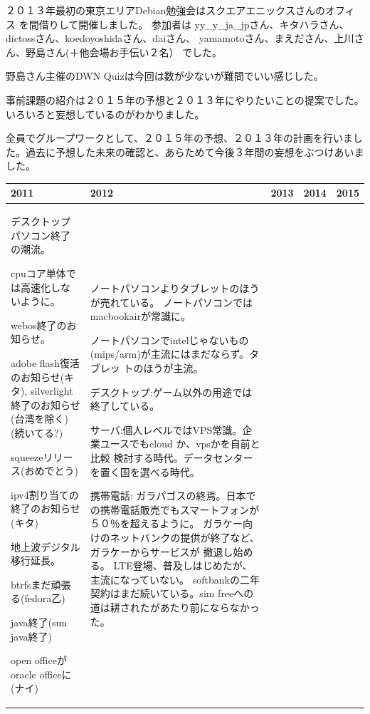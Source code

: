 \documentclass[mingoth,a4paper]{jsarticle}
\begin{document}
２０１３年最初の東京エリアDebian勉強会はスクエアエニックスさんのオフィス
を間借りして開催しました。
参加者は
yy\_y\_ja\_jpさん、キタハラさん、dictossさん、koedoyoshidaさん、daiさん、
yamamotoさん、まえださん、上川さん、野島さん(＋他会場お手伝い２名）
でした。

野島さん主催のDWN Quizは今回は数が少ないが難問でいい感じした。

事前課題の紹介は２０１５年の予想と２０１３年にやりたいことの提案でした。
いろいろと妄想しているのがわかりました。

全員でグループワークとして、２０１５年の予想、２０１３年の計画を行いまし
た。過去に予想した未来の確認と、あらためて今後３年間の妄想をぶつけあいま
した。

{%
\footnotesize
\begin{tabular}[t]{|p{8em}|p{14em}|p{10em}|p{8em}|p{10em}|}
\hline
2011 &2012 & 2013 & 2014 & 2015 \\
\hline

 デスクトップパソコン終了の潮流。

 cpuコア単体では高速化しないように。

 webos終了のお知らせ。

 adobe flash復活のお知らせ(キタ), silverlight終了のお知らせ(台湾を除く)(続いてる?)

 squeezeリリース(おめでとう)

 ipv4割り当ての終了のお知らせ(キタ)

 地上波デジタル移行延長。

 btrfsまだ頑張る(fedora乙)

 java終了(sun java終了)

 open officeがoracle officeに(ナイ)

 &

 ノートパソコンよりタブレットのほうが売れている。
 ノートパソコンではmacbookairが常識に。

 ノートパソコンでintelじゃないもの(mips/arm)が主流にはまだならず。タブレッ
 トのほうが主流。

 デスクトップ:ゲーム以外の用途では終了している。

 サーバ:個人レベルではVPS常識。企業ユースでもcloud か、vpsかを自前と比較
     検討する時代。データセンターを置く国を選べる時代。

 携帯電話:
 ガラパゴスの終焉。日本での携帯電話販売でもスマートフォンが５０％を超えるように。
     ガラケー向けのネットバンクの提供が終了など、ガラケーからサービスが
     撤退し始める。
 LTE登場、普及しはじめたが、主流になっていない。
 softbankの二年契約はまだ続いている。sim freeへの道は耕されたがあたり前にならなかった。


\end{tabular}}
\end{document}
